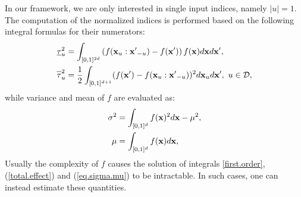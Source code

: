 In our framework, we are only interested in single input indices, namely $|u|=1$. The computation of the normalized indices is performed based on the following integral formulas for their numerators:
\begin{align}
\label{first.order}
\underline{\tau}_u^2  &= \int_{[0,1]^{2d}} \left(
f(\vx_u:{\vx'}_{-u})-f(\vx')\right)f(\vx)d\vx d{\vx'}, \\
\label{total.effect}
\ov{$\tau$}_u^2 &= \frac{1}{2}\int_{[0,1]^{d+1}}(f(\vx')-f(\vx_u:{\vx'}_{-u}))^2 d\vx_u d{\vx'}, \ u \in \mathcal{D},
\end{align}
while variance and mean of $f$ are evaluated as:
\begin{gather}
\begin{aligned}
\sigma^2 &= \int_{[0,1]^{d}} f(\boldsymbol{\mathbf{x}})^2d{\boldsymbol{\mathbf{x}}} - \mu^2, \\
 \mu &= \int_{[0,1]^{d}} f(\boldsymbol{\mathbf{x}}) d{\boldsymbol{\mathbf{x}}},
\label{eq.sigma.mu}
\end{aligned}
\end{gather}
Usually the complexity of $f$ causes the solution of integrals \eqref{first.order}, (\ref{total.effect}) and (\ref{eq.sigma.mu}) to be intractable. In such cases, one can instead estimate these quantities.

